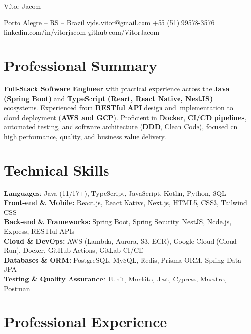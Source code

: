 \documentclass[10pt, letterpaper]{article}
\newenvironment{header}{
    \setlength{\topsep}{0pt}\par\kern\topsep\centering\linespread{1.5}
}{
    \par\kern\topsep
}
\begin{document}
\begin{header}
    {\fontsize{25 pt}{25 pt}\selectfont V\'itor Jacom}

    \vspace{5 pt}

    \normalsize
    Porto Alegre -- RS -- Brazil \quad \href{mailto:vjds.vitor@gmail.com}{vjds.vitor@gmail.com} \quad \href{tel:+55 51 99578 3576}{+55 (51) 99578-3576} \\
    \href{https://www.linkedin.com/in/vitorjacom/}{linkedin.com/in/vitorjacom} \quad \href{https://github.com/VitorJacom}{github.com/VitorJacom}
\end{header}

\section*{Professional Summary}
\textbf{Full-Stack Software Engineer} with practical experience across the \textbf{Java (Spring Boot)} and \textbf{TypeScript (React, React Native, NestJS)} ecosystems. Experienced from \textbf{RESTful API} design and implementation to cloud deployment (\textbf{AWS and GCP}). Proficient in \textbf{Docker}, \textbf{CI/CD pipelines}, automated testing, and software architecture (\textbf{DDD}, Clean Code), focused on high performance, quality, and business value delivery.

\section*{Technical Skills}
\noindent\textbf{Languages:} Java (11/17+), TypeScript, JavaScript, Kotlin, Python, SQL \\
\textbf{Front-end \& Mobile:} React.js, React Native, Next.js, HTML5, CSS3, Tailwind CSS \\
\textbf{Back-end \& Frameworks:} Spring Boot, Spring Security, NestJS, Node.js, Express, RESTful APIs \\
\textbf{Cloud \& DevOps:} AWS (Lambda, Aurora, S3, ECR), Google Cloud (Cloud Run), Docker, GitHub Actions, GitLab CI/CD \\
\textbf{Databases \& ORM:} PostgreSQL, MySQL, Redis, Prisma ORM, Spring Data JPA \\
\textbf{Testing \& Quality Assurance:} JUnit, Mockito, Jest, Cypress, Maestro, Postman

\section*{Professional Experience}
\end{document}

